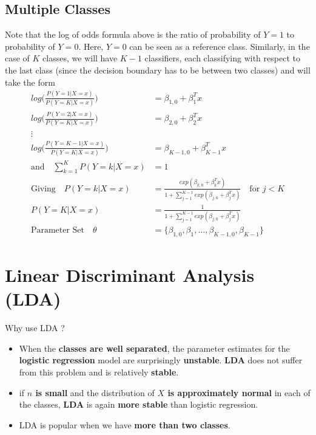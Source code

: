 \documentclass[../statistical_learning_notes.tex]{subfiles}
\begin{document}
    \subsection{Multiple Classes}
    Note that the log of odds formula above is the ratio of probability of $Y=1$ to probability of $Y=0$. Here, $Y=0$ can be seen as a reference class. Similarly, in the case of $K$ classes, we will have $K-1$ classifiers, each classifying with respect to the last class (since the decision boundary has to be between two classes) and will take the form
    \begin{align*}
        log \bigg( \frac{P(Y=1|X=x)}{P(Y=K|X=x)} \bigg) &= \beta_{1,0} + \beta_{1}^{T}x\\
        log \bigg( \frac{P(Y=2|X=x)}{P(Y=K|X=x)} \bigg) &= \beta_{2,0} + \beta_{2}^{T}x\\
        \vdots\\
        log \bigg( \frac{P(Y=K-1|X=x)}{P(Y=K|X=x)} \bigg) &= \beta_{K-1,0} + \beta_{K-1}^{T}x\\
        \text{and} \quad \sum_{k=1}^{K} P(Y=k|X=x) &= 1\\
        \text{Giving} \quad P(Y=k|X=x) &= \frac{exp(\beta_{k,0} + \beta_{k}^{T}x)}{1 + \sum_{j=1}^{K-1} exp(\beta_{j,0} + \beta_{j}^{T}x)} \quad \text{for $j<K$}\\
        P(Y=K|X=x) &= \frac{1}{1 + \sum_{j=1}^{K-1} exp(\beta_{j,0} + \beta_{j}^{T}x)}\\
        \text{Parameter Set} \quad \theta &= \{ \beta_{1,0}, \beta_{1}, \ldots, \beta_{K-1,0}, \beta_{K-1} \}
    \end{align*}

    \section{Linear Discriminant Analysis (LDA)}
    Why use LDA ?
    \begin{itemize}
        \item When the \textbf{classes are well separated}, the parameter estimates for the \textbf{logistic regression} model are surprisingly \textbf{unstable}. \textbf{LDA} does not suffer from this problem and is relatively \textbf{stable}.
        \item if \textbf{$n$ is small} and the distribution of \textbf{$X$ is approximately normal} in each of the classes, \textbf{LDA} is again \textbf{more stable} than logistic regression.
        \item LDA is popular when we have \textbf{more than two classes}.
    \end{itemize}
\end{document}
